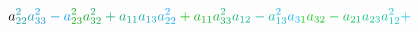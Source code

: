 \documentclass[12pt]{article}
\begin{document}
\begin{displaymath}
{a} _ { \mathcolor[RGB]{15,150,135}{2} \mathcolor[RGB]{15,150,150}{2} } ^ { \mathcolor[RGB]{15,150,165}{2} } \mathcolor[RGB]{15,150,180}{a} _ { \mathcolor[RGB]{15,150,195}{3} \mathcolor[RGB]{15,150,210}{3} } ^ { \mathcolor[RGB]{15,150,225}{2} } \mathcolor[RGB]{15,150,240}{-} \mathcolor[RGB]{15,150,255}{a} _ { \mathcolor[RGB]{15,165,0}{2} \mathcolor[RGB]{15,165,15}{3} } ^ { \mathcolor[RGB]{15,165,30}{2} } \mathcolor[RGB]{15,165,45}{a} _ { \mathcolor[RGB]{15,165,60}{3} \mathcolor[RGB]{15,165,75}{2} } ^ { \mathcolor[RGB]{15,165,90}{2} } \mathcolor[RGB]{15,165,105}{+} \mathcolor[RGB]{15,165,120}{a} _ { \mathcolor[RGB]{15,165,135}{1} \mathcolor[RGB]{15,165,150}{1} } \mathcolor[RGB]{15,165,165}{a} _ { \mathcolor[RGB]{15,165,180}{1} \mathcolor[RGB]{15,165,195}{3} } \mathcolor[RGB]{15,165,210}{a} _ { \mathcolor[RGB]{15,165,225}{2} \mathcolor[RGB]{15,165,240}{2} } ^ { \mathcolor[RGB]{15,165,255}{2} } \mathcolor[RGB]{15,180,0}{+} \mathcolor[RGB]{15,180,15}{a} _ { \mathcolor[RGB]{15,180,30}{1} \mathcolor[RGB]{15,180,45}{1} } \mathcolor[RGB]{15,180,60}{a} _ { \mathcolor[RGB]{15,180,75}{3} \mathcolor[RGB]{15,180,90}{3} } ^ { \mathcolor[RGB]{15,180,105}{2} } \mathcolor[RGB]{15,180,120}{a} _ { \mathcolor[RGB]{15,180,135}{1} \mathcolor[RGB]{15,180,150}{2} } \mathcolor[RGB]{15,180,165}{-} \mathcolor[RGB]{15,180,180}{a} _ { \mathcolor[RGB]{15,180,195}{1} \mathcolor[RGB]{15,180,210}{3} } ^ { \mathcolor[RGB]{15,180,225}{2} } \mathcolor[RGB]{15,180,240}{a} _ { \mathcolor[RGB]{15,180,255}{3} \mathcolor[RGB]{15,195,0}{1} } \mathcolor[RGB]{15,195,15}{a} _ { \mathcolor[RGB]{15,195,30}{3} \mathcolor[RGB]{15,195,45}{2} } \mathcolor[RGB]{15,195,60}{-} \mathcolor[RGB]{15,195,75}{a} _ { \mathcolor[RGB]{15,195,90}{2} \mathcolor[RGB]{15,195,105}{1} } \mathcolor[RGB]{15,195,120}{a} _ { \mathcolor[RGB]{15,195,135}{2} \mathcolor[RGB]{15,195,150}{3} } \mathcolor[RGB]{15,195,165}{a} _ { \mathcolor[RGB]{15,195,180}{1} \mathcolor[RGB]{15,195,195}{2} } ^ { \mathcolor[RGB]{15,195,210}{2} } \mathcolor[RGB]{15,195,225}{+} \mathcolor[RGB]{15,195,240}{\,
}
\end{displaymath}
\end{document}
